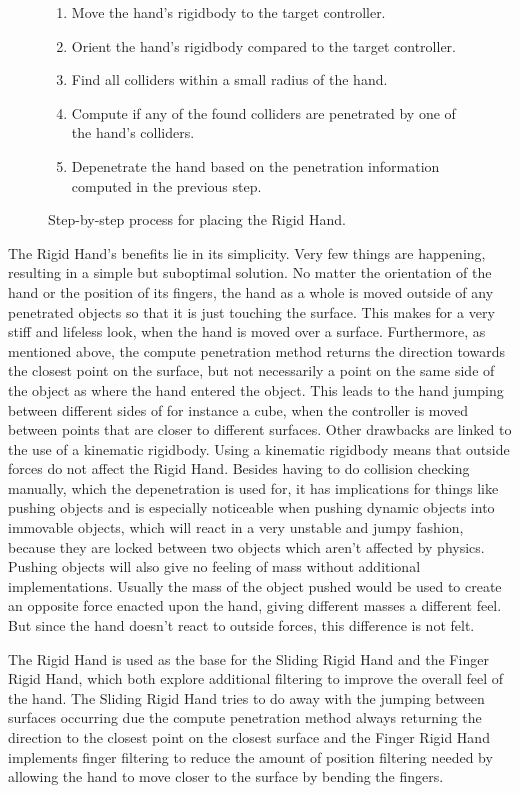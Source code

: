 \begin{figure}[H]
\centering
\small
\begin{enumerate}[noitemsep]
\item Move the hand's rigidbody to the target controller.
\item Orient the hand's rigidbody compared to the target controller.
\item Find all colliders within a small radius of the hand.
\item Compute if any of the found colliders are penetrated by one of the hand's colliders.
\item Depenetrate the hand based on the penetration information computed in the previous step.
\end{enumerate}
\caption{Step-by-step process for placing the Rigid Hand.}
\label{fig:stepByStepRigidHand}
\end{figure}

The Rigid Hand's benefits lie in its simplicity. Very few things are happening, resulting in a simple but suboptimal solution. No matter the orientation of the hand or the position of its fingers, the hand as a whole is moved outside of any penetrated objects so that it is just touching the surface. This makes for a very stiff and lifeless look, when the hand is moved over a surface. Furthermore, as mentioned above, the compute penetration method returns the direction towards the closest point on the surface, but not necessarily a point on the same side of the object as where the hand entered the object. This leads to the hand jumping between different sides of for instance a cube, when the controller is moved between points that are closer to different surfaces. Other drawbacks are linked to the use of a kinematic rigidbody. Using a kinematic rigidbody means that outside forces do not affect the Rigid Hand. Besides having to do collision checking manually, which the depenetration is used for, it has implications for things like pushing objects and is especially noticeable when pushing dynamic objects into immovable objects, which will react in a very unstable and jumpy fashion, because they are locked between two objects which aren't affected by physics. Pushing objects will also give no feeling of mass without additional implementations. Usually the mass of the object pushed would be used to create an opposite force enacted upon the hand, giving different masses a different feel. But since the hand doesn't react to outside forces, this difference is not felt.

The Rigid Hand is used as the base for the Sliding Rigid Hand and the Finger Rigid Hand, which both explore additional filtering to improve the overall feel of the hand. The Sliding Rigid Hand tries to do away with the jumping between surfaces occurring due the compute penetration method always returning the direction to the closest point on the closest surface and the Finger Rigid Hand implements finger filtering to reduce the amount of position filtering needed by allowing the hand to move closer to the surface by bending the fingers.

